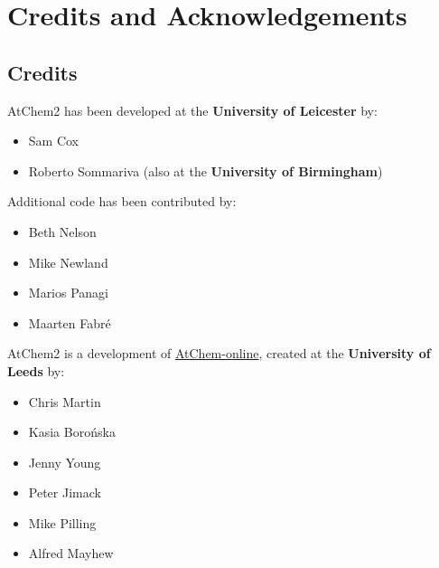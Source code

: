 %
%
%
%

\chapter{Credits and Acknowledgements} \label{ch:credits}

\section{Credits} \label{sec:credits}

AtChem2 has been developed at the \textbf{University of Leicester} by:

\begin{itemize}
\item Sam Cox
\item Roberto Sommariva (also at the \textbf{University of Birmingham})
\end{itemize}

\noindent
Additional code has been contributed by:

\begin{itemize}
\item Beth Nelson
\item Mike Newland
\item Marios Panagi
\item Maarten Fabr{\'e}
\end{itemize}

AtChem2 is a development of
\href{https://atchem.leeds.ac.uk/webapp/}{AtChem-online},
created at the \textbf{University of Leeds} by:

\begin{itemize}
\item Chris Martin
\item Kasia Boro{\'n}ska
\item Jenny Young
\item Peter Jimack
\item Mike Pilling
\item Alfred Mayhew
\end{itemize}

